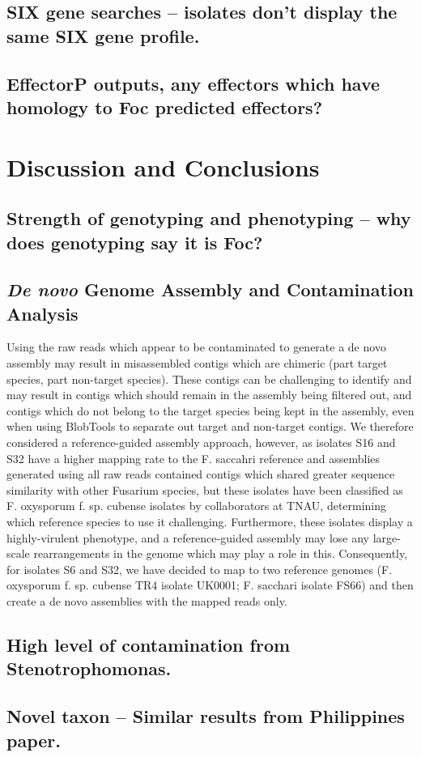 \subsection{SIX gene searches – isolates don’t display the same SIX gene profile.}

\subsection{EffectorP outputs, any effectors which have homology to Foc predicted effectors?}



\section{Discussion and Conclusions}
\subsection{Strength of genotyping and phenotyping – why does genotyping say it is Foc?}
\subsection{\textit{De novo} Genome Assembly and Contamination Analysis}
Using the raw reads which appear to be contaminated to generate a de novo assembly may result in misassembled contigs which are chimeric (part target species, part non-target species). These contigs can be challenging to identify and may result in contigs which should remain in the assembly being filtered out, and contigs which do not belong to the target species being kept in the assembly, even when using BlobTools to separate out target and non-target contigs. We therefore considered a reference-guided assembly approach, however, as isolates S16 and S32 have a higher mapping rate to the F. saccahri reference and assemblies generated using all raw reads contained contigs which shared greater sequence similarity with other Fusarium species, but these isolates have been classified as F. oxysporum f. sp. cubense isolates by collaborators at TNAU, determining which reference species to use it challenging. Furthermore, these isolates display a highly-virulent phenotype, and a reference-guided assembly may lose any large-scale rearrangements in the genome which may play a role in this. Consequently, for isolates S6 and S32, we have decided to map to two reference genomes (F. oxysporum f. sp. cubense TR4 isolate UK0001; F. sacchari isolate FS66) and then create a de novo assemblies with the mapped reads only. 
\subsection{High level of contamination from Stenotrophomonas.}
\subsection{Novel taxon – Similar results from Philippines paper.}

